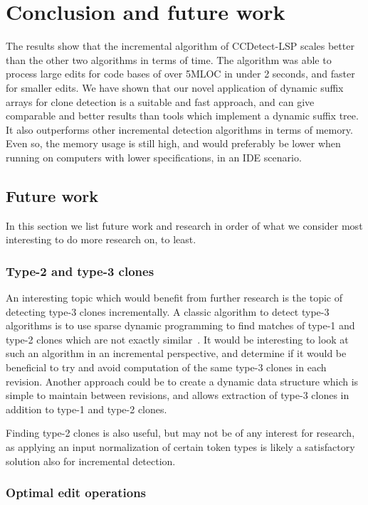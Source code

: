 \chapter{Conclusion and future work}

The results show that the incremental algorithm of CCDetect-LSP scales better than the
other two algorithms in terms of time. The algorithm was able to process large edits for
code bases of over 5MLOC in under 2 seconds, and faster for smaller edits. We have shown
that our novel application of dynamic suffix arrays for clone detection is a suitable and
fast approach, and can give comparable and better results than tools which implement a
dynamic suffix tree. It also outperforms other incremental detection algorithms in terms
of memory. Even so, the memory usage is still high, and would preferably be lower when
running on computers with lower specifications, in an IDE scenario. 

\section{Future work}

In this section we list future work and research in order of what we consider
most interesting to do more research on, to least.

\subsection*{Type-2 and type-3 clones}

An interesting topic which would benefit from further research is the topic of detecting
type-3 clones incrementally. A classic algorithm to detect type-3 algorithms is to use
sparse dynamic programming to find matches of type-1 and type-2 clones which are not
exactly similar~\cite{BakerSparseDynamicProgramming}. It would be interesting to look at
such an algorithm in an incremental perspective, and determine if it would be beneficial
to try and avoid computation of the same type-3 clones in each revision. Another approach
could be to create a dynamic data structure which is simple to maintain between revisions,
and allows extraction of type-3 clones in addition to type-1 and type-2 clones.

Finding type-2 clones is also useful, but may not be of any interest for research, as
applying an input normalization of certain token types is likely a satisfactory solution
also for incremental detection.

\subsection*{Optimal edit operations}

